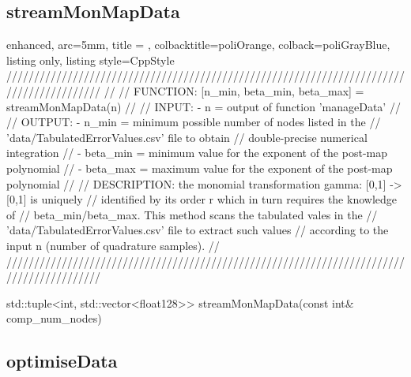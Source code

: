 \documentclass[a4paper, twosided]{book}
\begin{document}
\subsection[streamMonMapData]{\changefont streamMonMapData}\label{SubSec4.2.2}

\begin{tcblisting}{enhanced,
                   arc=5mm,
                   title = \color{black}{\large \ttfamily DatIo.cpp/streamMonMapData},
                   colbacktitle=poliOrange,
                   colback=poliGrayBlue,
                   listing only,
                   listing style=CppStyle}
/////////////////////////////////////////////////////////////////////////////////////////
//
//       FUNCTION: [n_min, {beta_min, beta_max}] = streamMonMapData(n)
//                
//          INPUT: - n = output of function 'manageData'
//
//         OUTPUT: - n_min = minimum possible number of nodes listed in the 
//                           'data/TabulatedErrorValues.csv' file to obtain 
//                           double-precise numerical integration
//                 - beta_min = minimum value for the exponent of the post-map polynomial
//                 - beta_max = maximum value for the exponent of the post-map polynomial
//
//    DESCRIPTION: the monomial transformation gamma: [0,1] -> [0,1] is uniquely 
//                 identified by its order r which in turn requires the knowledge of
//                 beta_min/beta_max. This method scans the tabulated vales in the 
//                 'data/TabulatedErrorValues.csv' file to extract such values
//                 according to the input n (number of quadrature samples).
//
/////////////////////////////////////////////////////////////////////////////////////////

std::tuple<int, std::vector<float128>> streamMonMapData(const int& comp_num_nodes)
\end{tcblisting}

\newpage
\subsection[optimiseData]{\changefont optimiseData}\label{SubSec4.2.3}
\end{document}
